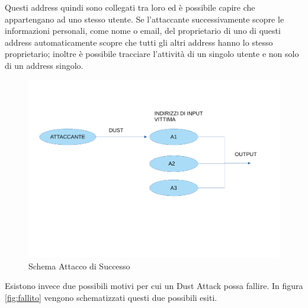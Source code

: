Questi address quindi sono collegati tra loro ed è possibile capire che appartengano ad uno stesso utente. Se l'attaccante successivamente scopre le informazioni personali, come nome o email, del proprietario di uno di questi address automaticamente scopre che tutti gli altri address hanno lo stesso proprietario; inoltre è possibile tracciare l'attività di un singolo utente e non solo di un address singolo.
\begin{figure}[h!]
    \centering
    \includegraphics[scale=0.5]{Images/successo.pdf}
    \caption{Schema Attacco di Successo}
    \label{fig:success}
\end{figure}
\FloatBarrier
Esistono invece due possibili motivi per cui un Dust Attack possa fallire. In figura \ref{fig:fallito} vengono schematizzati questi due possibili esiti.

